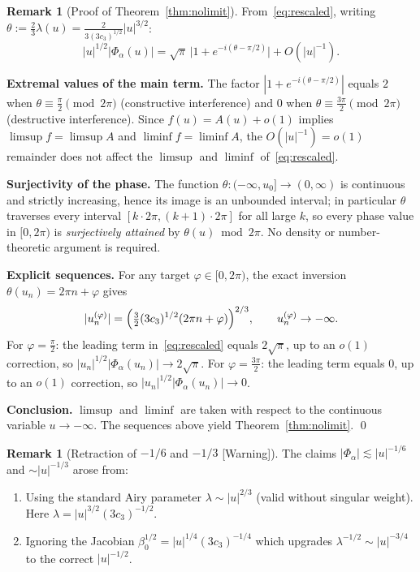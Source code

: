\documentclass[12pt,a4paper]{amsart}
\theoremstyle{definition}
\newtheorem{remark}[theorem]{Remark}
\newcommand{\Warn}{\textup{[Warning]}}
\begin{document}
\begin{remark}[Proof of Theorem~\ref{thm:nolimit}]
\label{rem:extremal}
From~\eqref{eq:rescaled}, writing
$\theta:=\tfrac{2}{3}\lambda(u)=\tfrac{2}{3(3c_3)^{1/2}}|u|^{3/2}$:
\[
  |u|^{1/2}|\Phi_\alpha(u)|
  = \sqrt{\pi}\,
  \bigl|1 + e^{-i(\theta-\pi/2)}\bigr|
  + O(|u|^{-1}).
\]

\noindent\textbf{Extremal values of the main term.}
The factor $|1+e^{-i(\theta-\pi/2)}|$
equals $2$ when $\theta\equiv\tfrac{\pi}{2}\pmod{2\pi}$
(constructive interference)
and $0$ when $\theta\equiv\tfrac{3\pi}{2}\pmod{2\pi}$
(destructive interference).
Since $f(u) = A(u) + o(1)$ implies
$\limsup f = \limsup A$ and $\liminf f = \liminf A$,
the $O(|u|^{-1}) = o(1)$ remainder does not affect
the $\limsup$ and $\liminf$ of~\eqref{eq:rescaled}.

\medskip
\noindent\textbf{Surjectivity of the phase.}
The function $\theta:(-\infty,u_0]\to(0,\infty)$
is continuous and strictly increasing,
hence its image is an unbounded interval;
in particular $\theta$ traverses every interval
$[k\cdot 2\pi,(k+1)\cdot 2\pi]$ for all large $k$,
so every phase value in $[0,2\pi)$ is
\emph{surjectively attained} by $\theta(u)\bmod 2\pi$.
No density or number-theoretic argument is required.

\medskip
\noindent\textbf{Explicit sequences.}
For any target $\varphi\in[0,2\pi)$,
the exact inversion $\theta(u_n)=2\pi n+\varphi$ gives
\[
  |u_n^{(\varphi)}|
  = \Bigl(\tfrac{3}{2}(3c_3)^{1/2}(2\pi n+\varphi)\Bigr)^{2/3},
  \qquad
  u_n^{(\varphi)}\to-\infty.
\]
For $\varphi=\tfrac{\pi}{2}$: the leading term in~\eqref{eq:rescaled}
equals $2\sqrt{\pi}$, up to an $o(1)$ correction,
so $|u_n|^{1/2}|\Phi_\alpha(u_n)|\to 2\sqrt{\pi}$.
For $\varphi=\tfrac{3\pi}{2}$: the leading term equals $0$,
up to an $o(1)$ correction,
so $|u_n|^{1/2}|\Phi_\alpha(u_n)|\to 0$.

\medskip
\noindent\textbf{Conclusion.}
$\limsup$ and $\liminf$ are taken with respect
to the continuous variable $u\to-\infty$.
The sequences above yield
Theorem~\ref{thm:nolimit}. \qed
\end{remark}

\begin{remark}[Retraction of
  $-1/6$ and $-1/3$ \Warn]
\label{rem:retract}
The claims $|\Phi_\alpha|\lesssim|u|^{-1/6}$
and $\sim|u|^{-1/3}$ arose from:
\begin{enumerate}[{\rm(i)}]
\item Using the standard Airy
  parameter $\lambda\sim|u|^{2/3}$
  (valid without singular weight).
  Here $\lambda=|u|^{3/2}(3c_3)^{-1/2}$.
\item Ignoring the Jacobian
  $\beta_0^{1/2}=|u|^{1/4}(3c_3)^{-1/4}$
  which upgrades $\lambda^{-1/2}
  \sim|u|^{-3/4}$ to
  the correct $|u|^{-1/2}$.
\end{enumerate}
\end{remark}
\end{document}
